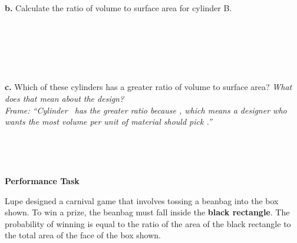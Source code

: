 \documentclass[11pt]{article}
\newcommand{\frameblank}{\underline{\hspace{4em}}}
\newcommand{\writeline}{\rule[-2pt]{0pt}{12pt}}
\begin{document}
\vspace{0.3em}
\textbf{b.} Calculate the ratio of volume to surface area for cylinder B. \\
\writeline \\[8pt]
\writeline \\[8pt]
\writeline \\[8pt]
\writeline

\vspace{0.3em}
\textbf{c.} Which of these cylinders has a greater ratio of volume to surface area? \emph{What does that mean about the design?} \\
{\small\itshape Frame: ``Cylinder \frameblank\ has the greater ratio because \frameblank, which means a designer who wants the most volume per unit of material should pick \frameblank.''}\\
\writeline \\[8pt]
\writeline \\[8pt]
\writeline

\newpage

\textbf{Performance Task}

\vspace{0.3em}
Lupe designed a carnival game that involves tossing a beanbag into the
box shown. To win a prize, the beanbag must fall inside the
\textbf{black rectangle}. The probability of winning is equal to the
ratio of the area of the black rectangle to the total area of the face
of the box shown.

\begin{center}
\end{center}
\end{document}
